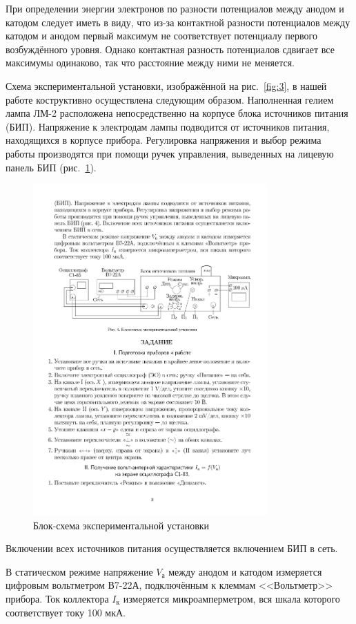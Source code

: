 \documentclass[a4paper]{article}
\begin{document}
При определении энергии электронов по разности потенциалов между
анодом и катодом следует иметь в виду, что из-за контактной
разности потенциалов между катодом и анодом первый максимум не
соответствует потенциалу первого возбуждённого уровня. Однако
контактная разность потенциалов сдвигает все максимумы одинаково,
так что расстояние между ними не меняется.

Схема экспериментальной установки, изображённой на рис.~\ref{fig:3},
 в нашей работе коструктивно осуществлена следующим образом.
Наполненная гелием лампа ЛМ-2 расположена непосредственно на корпусе
блока источников питания (БИП). Напряжение к электродам лампы
подводится от источников питания, находящихся в корпусе прибора.
Регулировка напряжения и выбор режима работы
производятся при помощи ручек управления, выведенных на лицевую
панель БИП (рис.~\ref{fig:4}).
\begin{figure}[ht]
	\centering
	\includegraphics[width=0.8\textwidth]{4}
	\caption{Блок-схема экспериментальной установки}
	\label{fig:4}
\end{figure}
Включении всех источников питания осуществляется
включением БИП в сеть.

В статическом режиме напряжение $V_\text{а}$ между анодом и катодом
измеряется цифровым вольтметром В7-22А, подключённым к клеммам
<<Вольтметр>> прибора. Ток коллектора $I_\text{к}$ измеряется
микроамперметром, вся шкала которого соответствует току 100 мкА.
\end{document}
